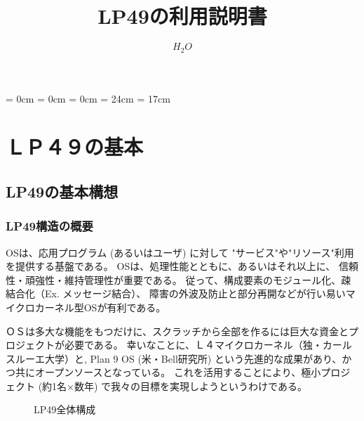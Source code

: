 


\topmargin = 0cm
\oddsidemargin = 0cm
\evensidemargin = 0cm
\textheight = 24cm
\textwidth = 17cm

\setcounter{secnumdepth}{2}



\title{\huge\bf
LP49の利用説明書
}

\author{$H_2O$}



\maketitle

\tableofcontents
\part{ＬＰ４９の基本}

\chapter{LP49の基本構想}
\section{LP49構造の概要}
   OSは、応用プログラム (あるいはユーザ) に対して
   "サービス"や"リソース"利用を提供する基盤である。
   OSは、処理性能とともに、あるいはそれ以上に、
   信頼性・頑強性・維持管理性が重要である。
   従って、構成要素のモジュール化、疎結合化（Ex. メッセージ結合）、
   障害の外波及防止と部分再開などが行い易いマイクロカーネル型OSが有利である。

   ＯＳは多大な機能をもつだけに、スクラッチから全部を作るには巨大な資金とプロジェクトが必要である。
   幸いなことに、Ｌ４マイクロカーネル（独・カールスルーエ大学）と, Plan 9 OS (米・Bell研究所)
   という先進的な成果があり、かつ共にオープンソースとなっている。
   これを活用することにより、極小プロジェクト (約1名×数年)
   で我々の目標を実現しようというわけである。

\begin{figure}[hbt]
  \begin{center}
   \epsfxsize=440pt
    \caption{LP49全体構成}
    \label{fig:LP49general}
  \end{center}
\end{figure}


